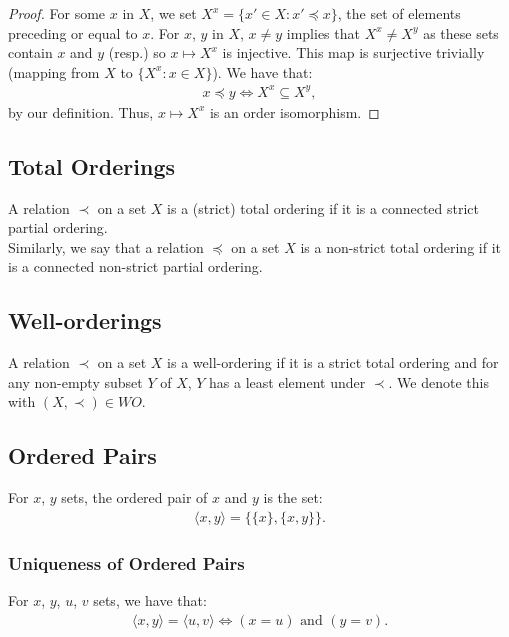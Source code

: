 \begin{proof}
   For some $x$ in $X$, we set $X^x = \{x' \in X : x' \preceq x\}$,
   the set of elements preceding or equal to $x$. For $x$, $y$
   in $X$, $x \neq y$ implies that $X^x \neq X^y$ as these sets
   contain $x$ and $y$ (resp.) so $x \mapsto X^x$ is injective.
   This map is surjective trivially (mapping from $X$ to
   $\{X^x : x \in X\}$).
   We have that: \begin{align*}
       x \preceq y \Longleftrightarrow X^x \subseteq X^y,
   \end{align*} by our definition. Thus, $x \mapsto X^x$ is
   an order isomorphism.
\end{proof}

\subsection{Total Orderings}

A relation $\prec$ on a set $X$ is a (strict) total ordering if it
is a connected strict partial ordering.
\\[\baselineskip]
Similarly, we say that a relation $\preceq$ on a set $X$ is a non-strict
total ordering if it is a connected non-strict partial ordering.

\subsection{Well-orderings}

A relation $\prec$ on a set $X$ is a well-ordering if it is a
strict total ordering and for any non-empty subset $Y$ of $X$,
$Y$ has a least element under $\prec$. We denote this with 
$(X, \prec) \in WO$.

\subsection{Ordered Pairs}

For $x$, $y$ sets, the ordered pair of $x$ and $y$ is the set: \begin{align*}
    \langle x, y \rangle = \{\{x\}, \{x, y\}\}.
\end{align*}

\subsubsection{Uniqueness of Ordered Pairs}

For $x$, $y$, $u$, $v$ sets, we have that: \begin{align*}
    \langle x, y \rangle = \langle u, v \rangle 
    \Longleftrightarrow
    (x = u) \text{ and } (y = v).
\end{align*}

